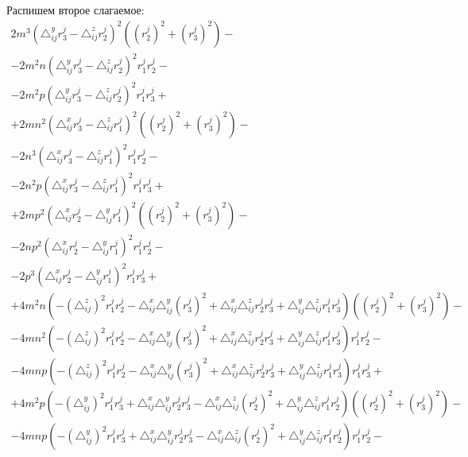 Распишем второе слагаемое:
$$\begin{gathered}
	2 m^3 \left( \triangle_{ij}^y r_3^j - \triangle_{ij}^z r_2^j \right)^2           \left((r_2^j)^2 + (r_3^j)^2\right) - \\
	- 2 m^2 n \left( \triangle_{ij}^y r_3^j - \triangle_{ij}^z r_2^j \right)^2 r_1^j r_2^j - \\
	- 2 m^2 p \left( \triangle_{ij}^y r_3^j - \triangle_{ij}^z r_2^j \right)^2  r_1^j r_3^j + \\
	+ 2 m n^2 \left( \triangle_{ij}^x r_3^j - \triangle_{ij}^z r_1^j \right)^2          \left((r_2^j)^2 + (r_3^j)^2\right) - \\
	- 2 n^3 \left( \triangle_{ij}^x r_3^j - \triangle_{ij}^z r_1^j \right)^2 r_1^j r_2^j - \\
	- 2 n^2 p \left( \triangle_{ij}^x r_3^j - \triangle_{ij}^z r_1^j \right)^2 r_1^j r_3^j + \\
	+ 2 m p^2 \left( \triangle_{ij}^x r_2^j - \triangle_{ij}^y r_1^j \right)^2           \left((r_2^j)^2 + (r_3^j)^2\right) - \\
	- 2 n p^2\left( \triangle_{ij}^x r_2^j - \triangle_{ij}^y r_1^j \right)^2 r_1^j r_2^j - \\
	- 2 p^3 \left( \triangle_{ij}^x r_2^j - \triangle_{ij}^y r_1^j \right)^2 r_1^j r_3^j + \\
	+ 4 m^2 n \left( - \left( \triangle_{ij}^z \right)^2 r_1^j r_2^j - \triangle_{ij}^x \triangle_{ij}^y (r_3^j)^2 + \triangle_{ij}^x  \triangle_{ij}^z r_2^j r_3^j + \triangle_{ij}^y  \triangle_{ij}^z r_1^j r_3^j \right)      \left((r_2^j)^2 + (r_3^j)^2\right) - \\
	- 4 m n^2 \left( - \left( \triangle_{ij}^z \right)^2 r_1^j r_2^j - \triangle_{ij}^x \triangle_{ij}^y (r_3^j)^2 + \triangle_{ij}^x  \triangle_{ij}^z r_2^j r_3^j + \triangle_{ij}^y  \triangle_{ij}^z r_1^j r_3^j \right) r_1^j r_2^j - \\
	- 4 m n p \left( - \left( \triangle_{ij}^z \right)^2 r_1^j r_2^j - \triangle_{ij}^x \triangle_{ij}^y (r_3^j)^2 + \triangle_{ij}^x  \triangle_{ij}^z r_2^j r_3^j + \triangle_{ij}^y  \triangle_{ij}^z r_1^j r_3^j \right) r_1^j r_3^j + \\
	+ 4 m^2 p \left( - \left( \triangle_{ij}^y\right)^2 r_1^j r_3^j +  \triangle_{ij}^x \triangle_{ij}^y r_2^j r_3^j -  \triangle_{ij}^x  \triangle_{ij}^z (r_2^j)^2 +  \triangle_{ij}^y  \triangle_{ij}^z r_1^j r_2^j \right)   \left((r_2^j)^2 + (r_3^j)^2\right) - \\
	- 4 m n p \left( - \left( \triangle_{ij}^y\right)^2 r_1^j r_3^j +  \triangle_{ij}^x \triangle_{ij}^y r_2^j r_3^j -  \triangle_{ij}^x  \triangle_{ij}^z (r_2^j)^2 +  \triangle_{ij}^y  \triangle_{ij}^z r_1^j r_2^j \right) r_1^j r_2^j - \\

\end{gathered}$$
